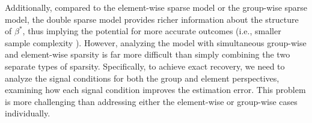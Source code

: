 \documentclass[12pt]{article}
\begin{document}
Additionally, compared to the element-wise sparse model or the group-wise sparse model, the double sparse model provides richer information about the structure of $\beta^*$, thus implying the potential for more accurate outcomes (i.e., smaller sample complexity \citep*{CZ22}). 
However, analyzing the model with simultaneous group-wise and element-wise sparsity is far more difficult than simply combining the two separate types of sparsity. 
Specifically, to achieve exact recovery, we need to analyze the signal conditions for both the group and element perspectives, examining how each signal condition improves the estimation error. 
This problem is more challenging than addressing either the element-wise \citep{CM18} or group-wise \citep{KM11group, butucea23group} cases individually.

\end{document}
